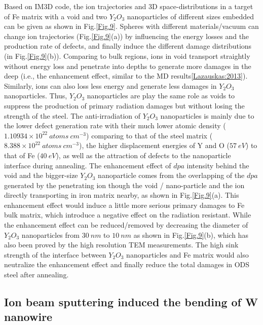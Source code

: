 Based on IM3D code, the ion trajectories and 3D space-distributions in a target of Fe matrix with a void and two $Y_2O_3$ nanoparticles of different sizes embedded can be given as shown in Fig.\ref{Fig.9}. Spheres with different materials/vacuum can change ion trajectories (Fig.\ref{Fig.9}(a)) by influencing the energy losses and the production rate of defects, and finally induce the different damage distributions (in Fig.\ref{Fig.9}(b)). Comparing to bulk regions, ions in void transport straightly without energy loss and penetrate into depths to generate more damages in the deep (i.e., the enhancement effect, similar to the MD results\ref{Lazauskas:2013}). Similarly, ions can also loss less energy and generate less damages in $Y_2O_3$ nanoparticles. Thus, $Y_2O_3$ nanoparticles are play the same role as voids to suppress the production of primary radiation damages but without losing the strength of the steel. The anti-irradiation of $Y_2O_3$ nanoparticles is mainly due to the lower defect generation rate with their much lower atomic density ($1.10934 \times 10^{22}~atoms~cm^{-3}$) comparing to that of the steel matrix ($8.388 \times 10^{22}~atoms~cm^{-3}$), the higher displacement energies of Y and O ($57~eV$) to that of Fe ($40~eV$), as well as the attraction of defects to the nanoparticle interface during annealing. The enhancement effect of $dpa$ intensity behind the void and  the bigger-size $Y_2O_3$ nanoparticle comes from the overlapping of the $dpa$ generated by the penetrating ion though the void / nano-particle and the ion directly transporting in iron matrix nearby, as shown in Fig.\ref{Fig.9}(a). This enhancement effect would induce a little more serious primary damages to Fe bulk matrix, which introduce a negative effect on the radiation resistant. While the enhancement effect can be reduced/removed by decreasing the diameter of $Y_2O_3$ nanoparticles from $30~nm$ to $10~nm$ as shown in Fig.\ref{Fig.9}(b), which has also been proved by the high resolution TEM measurements\cite{Lescoat:2012}. The high sink strength of the interface between $Y_2O_3$ nanoparticles and Fe matrix would also neutralize the enhancement effect and finally reduce the total damages in ODS steel after annealing.

\subsection{Ion beam sputtering induced the bending of W nanowire}

